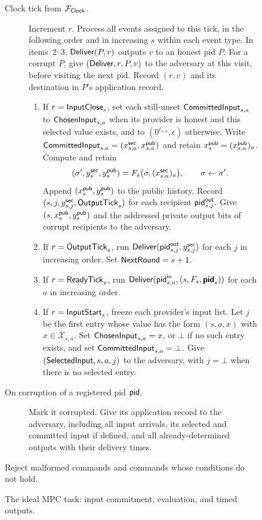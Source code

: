 \begin{figure}[!t]
{\begin{minipage}{0.95\textwidth}
\begin{description}
  \item[Clock tick from $\mathcal F_{\mathsf{Clock}}$.]
    Increment $r$.  Process all events assigned to this tick, in the
    following order and in increasing $s$ within each event type.
    In items~2--3, $\mathsf{Deliver}(P,v)$ outputs $v$ to an honest pid $P$.
    For a corrupt $P$, give $(\mathsf{Deliver},r,P,v)$ to the adversary at this
    visit, before visiting the next pid.  Record $(r,v)$ and its
    destination in $P$'s application record.
    \begin{enumerate}
      \item If $r=\mathsf{InputClose}_s$, set each still-unset
        $\mathsf{CommittedInput}_{s,a}$ to $\mathsf{ChosenInput}_{s,a}$ when its provider
        is honest and this selected value exists, and to
        $(0^{\ell_{s,a}},\epsilon)$ otherwise.  Write
        $\mathsf{CommittedInput}_{s,a}=(x^{\mathsf{sec}}_{s,a},x^{\mathsf{pub}}_{s,a})$ and retain
        $x^{\mathsf{pub}}_s=(x^{\mathsf{pub}}_{s,a})_a$.  Compute and retain
        \[
          (\sigma',y^{\mathsf{sec}}_s,y^{\mathsf{pub}}_s)
            =F_s\bigl(\sigma,(x^{\mathsf{sec}}_{s,a})_a\bigr),
          \qquad \sigma\gets\sigma'.
        \]
        Append $(x^{\mathsf{pub}}_s,y^{\mathsf{pub}}_s)$ to the public history.
        Record $(s,j,y^{\mathsf{sec}}_{s,j},\mathsf{OutputTick}_s)$ for each recipient
        $\mathsf{pid}^{\mathsf{out}}_{s,j}$.  Give $(s,x^{\mathsf{pub}}_s,y^{\mathsf{pub}}_s)$ and
        the addressed private output bits of corrupt recipients to the
        adversary.
      \item If $r=\mathsf{OutputTick}_s$, run
        $\mathsf{Deliver}(\mathsf{pid}^{\mathsf{out}}_{s,j},y^{\mathsf{sec}}_{s,j})$ for each $j$
        in increasing order.  Set $\mathsf{NextRound}=s+1$.
      \item If $r=\mathsf{ReadyTick}_s$, run
        $\mathsf{Deliver}(\mathsf{pid}^{\mathsf{in}}_{s,a},(s,F_s,\boldsymbol{\mathsf{pid}}_s))$
        for each $a$ in increasing order.
      \item If $r=\mathsf{InputStart}_s$, freeze each provider's input list.
        Let $j$ be the first entry whose value has the form
        $(s,a,x)$ with $x\in\mathcal X_{s,a}$.
        Set $\mathsf{ChosenInput}_{s,a}=x$, or $\bot$ if no such entry exists,
        and set $\mathsf{CommittedInput}_{s,a}=\bot$.
        Give $(\mathsf{SelectedInput},s,a,j)$ to the adversary, with $j=\bot$
        when there is no selected entry.
    \end{enumerate}

  \item[On corruption of a registered pid $\mathsf{pid}$.]
    Mark it corrupted.  Give its application record to the adversary,
    including all input arrivals, its selected and committed input if
    defined, and all already-determined outputs with their delivery times.
\end{description}
Reject malformed commands and commands whose conditions do not hold.
\end{minipage}}
\caption{The ideal MPC task: input commitment, evaluation, and timed outputs.}
\label{fig:mpc-execution}
\end{figure}


